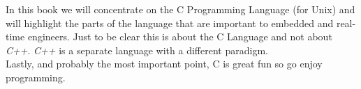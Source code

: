 In this book we will concentrate on the C Programming Language (for Unix) and will highlight the parts of the language that are important to embedded and real-time engineers. Just to be clear this is about the C Language and not about \textit{C++}. \textit{C++} is a separate language with a different paradigm.\\ 

Lastly, and probably the most important point, C is great fun so go enjoy programming.
